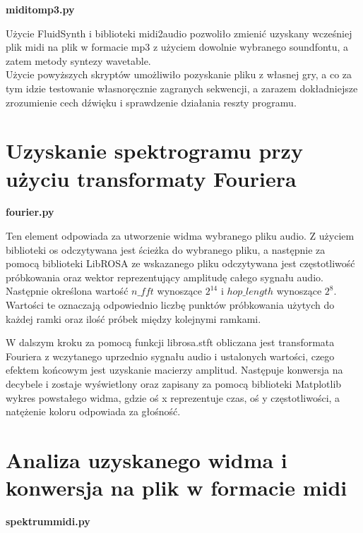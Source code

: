 \newpage
\noindent\textbf{miditomp3.py}

Użycie FluidSynth \cite{fluidsynth} i biblioteki midi2audio \cite{midi2audio} pozwoliło zmienić uzyskany wcześniej plik midi na plik w formacie mp3 z użyciem dowolnie wybranego soundfontu, a zatem metody syntezy wavetable.\\

Użycie powyższych skryptów umożliwiło pozyskanie pliku z własnej gry, a co za tym idzie testowanie własnoręcznie zagranych sekwencji, a zarazem dokładniejsze zrozumienie cech dźwięku i sprawdzenie działania reszty programu.

\section{Uzyskanie spektrogramu przy użyciu transformaty Fouriera}

\noindent\textbf{fourier.py}

Ten element odpowiada za utworzenie widma wybranego pliku audio. Z użyciem biblioteki os odczytywana jest ścieżka do wybranego pliku, a następnie za pomocą biblioteki LibROSA \cite{librosa} ze wskazanego pliku odczytywana jest częstotliwość próbkowania oraz wektor reprezentujący amplitudę całego sygnału audio. Następnie określona wartość  $n\_fft$ wynoszące $2^{14}$ i $hop\_length$ wynoszące $2^8$. Wartości te oznaczają odpowiednio liczbę punktów próbkowania użytych do każdej ramki oraz ilość próbek między kolejnymi ramkami.

W dalszym kroku za pomocą funkcji librosa.stft obliczana jest transformata Fouriera z wczytanego uprzednio sygnału audio i ustalonych wartości, czego efektem końcowym jest uzyskanie macierzy amplitud. Następuje konwersja na decybele i zostaje wyświetlony oraz zapisany za pomocą biblioteki Matplotlib \cite{matplotlib} wykres powstałego widma, gdzie oś x reprezentuje czas, oś y częstotliwości, a natężenie koloru odpowiada za głośność.

\section{ Analiza uzyskanego widma i konwersja na plik w formacie midi}

\noindent\textbf{spektrummidi.py}


